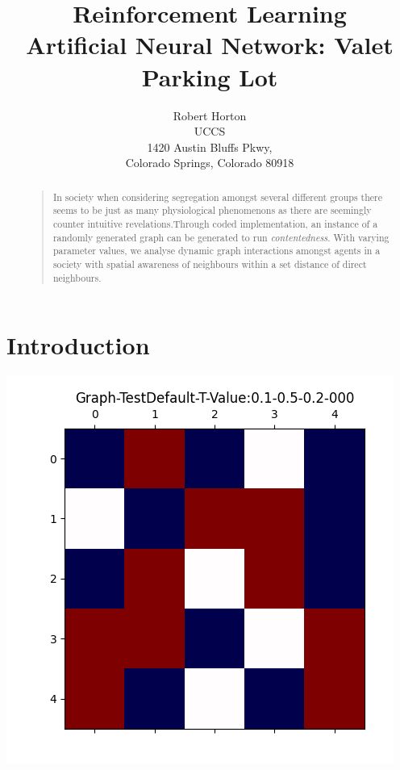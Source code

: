 \documentclass[letterpaper]{article}
\begin{document}
%
\title{Reinforcement Learning\\ Artificial Neural Network: Valet Parking Lot }
\author{Robert Horton\\
UCCS\\
1420 Austin Bluffs Pkwy,\\
Colorado Springs, Colorado 80918\\
}
\maketitle

\begin{abstract}
\begin{quote}
In society when considering segregation amongst several different groups there seems to be just as many physiological phenomenons as there are seemingly counter intuitive revelations.Through coded implementation, an instance of a randomly generated  graph can be generated to run \textit{contentedness}.  With varying parameter values, we analyse dynamic graph interactions amongst agents in a society with spatial awareness of neighbours within a set distance of direct neighbours.   
\end{quote}
\end{abstract}

\section{Introduction}

\begin{center}
\includegraphics[scale=0.7]{./Content/GenoratedGraphs/Graph-TestDefault-0.1-0.5-0.2/Graph-TestDefault-000}
\end{center}
\end{document}
